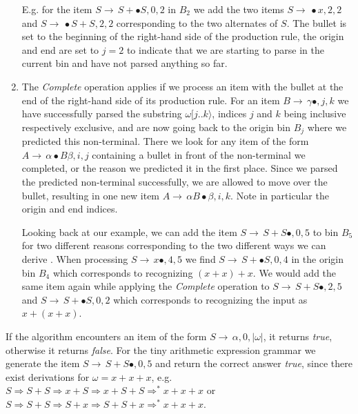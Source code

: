 \begin{isabellebody}
\begin{isamarkuptext}
\begin{enumerate}
    E.g. for the item  $S \rightarrow \, S + \bullet S, 0, 2$ in $B_2$
    we add the two items $S \rightarrow \, \bullet x, 2, 2$ and $S \rightarrow \, \bullet S + S, 2, 2$ corresponding
    to the two alternates of $S$. The bullet is set to the beginning of the right-hand side of the production
    rule, the origin and end are set to $j = 2$ to indicate that we are starting to parse in the current bin and
    have not parsed anything so far.
  \item The \textit{Complete} operation applies if we process an item with the bullet at the end of the
    right-hand side of its production rule. For an item $B \rightarrow \, \gamma \bullet, j, k$ we have successfully parsed the substring
    $\omega [ j..k \rangle$, indices $j$ and $k$ being inclusive respectively exclusive, and are now going back to the origin bin $B_j$ where we predicted this non-terminal. There we look for any item of the form
    $A \rightarrow \, \alpha \bullet B \beta, i, j$ containing a bullet in front of the non-terminal we completed, or the reason we
    predicted it in the first place. Since we parsed the predicted non-terminal successfully, we are allowed to
    move over the bullet, resulting in one new item $A \rightarrow \, \alpha B \bullet \beta, i, k$. Note in particular
    the origin and end indices.

    Looking back at our example, we can add the item $S \rightarrow \, S + S \bullet, 0, 5$ to bin $B_5$
    for two different reasons corresponding to the two different ways we can derive \omega.
    When processing $S \rightarrow \, x \bullet, 4, 5$ we find $S \rightarrow \, S + \bullet S, 0, 4$ in the origin
    bin $B_4$ which corresponds to recognizing $(x + x) + x$. We would add the same item again
    while applying the \textit{Complete} operation to $S \rightarrow \, S + S \bullet, 2, 5$ and $S \rightarrow \, S + \bullet S, 0, 2$
    which corresponds to recognizing the input as $x + (x + x)$.
\end{enumerate}

If the algorithm encounters an item of the form $S \rightarrow \, \alpha, 0, \lvert \omega \rvert$,
it returns \textit{true}, otherwise it returns \textit{false}. For the tiny arithmetic expression grammar
we generate the item $S \rightarrow \, S + S \bullet, 0, 5$ and return the correct answer \textit{true},
since there exist derivations for $\omega = x + x + x$, e.g.
$S \Rightarrow S + S \Rightarrow x + S \Rightarrow x + S + S \Rightarrow^{\ast} x + x + x$ or
$S \Rightarrow S + S \Rightarrow S + x \Rightarrow S + S + x \Rightarrow^{\ast} x + x + x$.


\end{isamarkuptext}
\end{isabellebody}
